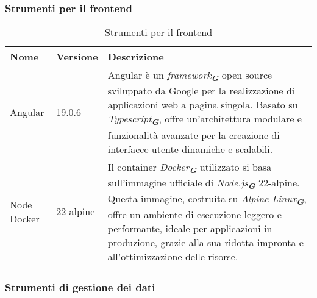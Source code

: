 \subsubsection{Strumenti per il frontend}
\label{subsec:strumenti_frontend}
\begin{table}[h!]
    \centering
    \renewcommand{\arraystretch}{1.6} %
    \begin{tabularx}{\textwidth}{|p{2cm}|p{2cm}|X|} \hline
    \rowcolor[HTML]{FFD700} 
    \textbf{Nome} & \textbf{Versione} & \textbf{Descrizione} \\ \hline
    Angular & 19.0.6 & Angular è un \emph{framework}\textsubscript{\textbf{\textit{G}}} open source sviluppato da Google per la realizzazione di applicazioni web a pagina singola. 
    Basato su \emph{Typescript}\textsubscript{\textbf{\textit{G}}}, offre un'architettura modulare e funzionalità avanzate per la creazione di interfacce utente dinamiche e scalabili. \\ \hline
    Node Docker & 22-alpine & Il container \emph{Docker}\textsubscript{\textbf{\textit{G}}} utilizzato si basa sull'immagine ufficiale di \emph{Node.js}\textsubscript{\textbf{\textit{G}}} 22-alpine. 
    Questa immagine, costruita su \emph{Alpine Linux}\textsubscript{\textbf{\textit{G}}}, offre un ambiente di esecuzione leggero e performante, ideale per applicazioni in produzione, 
    grazie alla sua ridotta impronta e all'ottimizzazione delle risorse. \\ \hline
    \end{tabularx}
    \caption{Strumenti per il frontend}
\end{table}


\subsubsection{Strumenti di gestione dei dati}
\label{subsec:strumenti_gestione_dati}

\newpage

